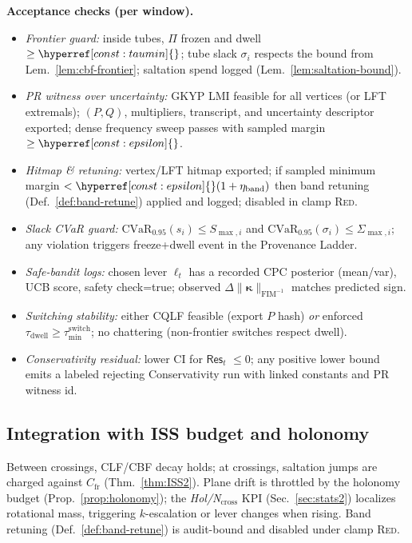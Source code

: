 \documentclass[10pt]{article}
\newcommand{\FIM}{\mathrm{FIM}}
\newcommand{\constref}[1]{\hyperref[const:#1]{\ensuremath{\csname constsym#1\endcsname}}}
\begin{document}
\begin{mdframed}
\textbf{Acceptance checks (per window).}
\begin{itemize}[leftmargin=*]
\item \emph{Frontier guard:} inside tubes, $\Pi$ frozen and dwell $\ge\constref{taumin}$; tube slack $\sigma_i$ respects the bound from Lem.~\ref{lem:cbf-frontier}; saltation spend logged (Lem.~\ref{lem:saltation-bound}).
\item \emph{PR witness over uncertainty:} GKYP LMI feasible for all vertices (or LFT extremals); $(P,Q)$, multipliers, transcript, and uncertainty descriptor exported; dense frequency sweep passes with sampled margin $\ge \constref{epsilon}$.
\item \emph{Hitmap \& retuning:} vertex/LFT hitmap exported; if sampled minimum margin $<\constref{epsilon}(1+\eta_{\mathrm{band}})$ then band retuning (Def.~\ref{def:band-retune}) applied and logged; disabled in clamp \textsc{Red}.
\item \emph{Slack CVaR guard:} $\mathrm{CVaR}_{0.95}(s_i)\le S_{\max,i}$ and $\mathrm{CVaR}_{0.95}(\sigma_i)\le \Sigma_{\max,i}$; any violation triggers freeze+dwell event in the Provenance Ladder.
\item \emph{Safe-bandit logs:} chosen lever $\ell_t$ has a recorded CPC posterior (mean/var), UCB score, safety check=\textsf{true}; observed $\Delta\|\bm\kappa\|_{\FIM^{-1}}$ matches predicted sign.
\item \emph{Switching stability:} either CQLF feasible (export $P$ hash) \emph{or} enforced $\tau_{\mathrm{dwell}}\!\ge\!\tau_{\min}^{\mathrm{switch}}$; no chattering (non-frontier switches respect dwell).
\item \emph{Conservativity residual:} lower CI for $\mathsf{Res}_t$ $\le 0$; any positive lower bound emits a labeled rejecting \textsf{Conservativity} run with linked constants and PR witness id.
\end{itemize}
\end{mdframed}

\subsection*{Integration with ISS budget and holonomy}
Between crossings, CLF/CBF decay holds; at crossings, saltation jumps are charged against $C_{\mathrm{fr}}$ (Thm.~\ref{thm:ISS2}). Plane drift is throttled by the holonomy budget (Prop.~\ref{prop:holonomy}); the \emph{Hol/N$_{\mathrm{cross}}$} KPI (Sec.~\ref{sec:stats2}) localizes rotational mass, triggering $k$-escalation or lever changes when rising. Band retuning (Def.~\ref{def:band-retune}) is audit-bound and disabled under clamp \textsc{Red}.
\end{document}
